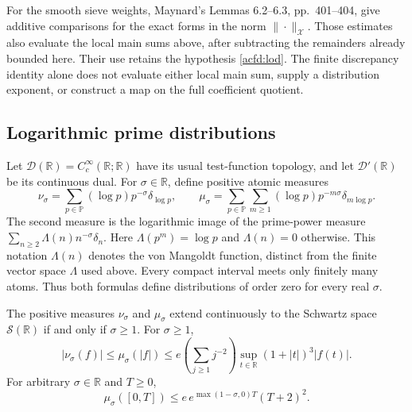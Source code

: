 For the smooth sieve weights, Maynard's Lemmas 6.2--6.3, pp.~401--404,
give additive comparisons for the exact forms in the norm $\|\cdot\|_{\mathcal X}$.
Those estimates also evaluate the local main sums above, after subtracting
the remainders already bounded here.  Their use retains the hypothesis
\eqref{acfd:lod}.  The finite discrepancy identity alone does not evaluate
either local main sum, supply a distribution exponent, or construct a map
on the full coefficient quotient.

\subsection{Logarithmic prime distributions}

Let $\mathcal D(\mathbb R)=C_c^\infty(\mathbb R;\mathbb R)$ have its usual
test-function topology, and let $\mathcal D'(\mathbb R)$ be its continuous dual.
For $\sigma\in\mathbb R$, define positive atomic measures
\begin{equation}\label{acfd:prime-measures}
 \nu_\sigma=\sum_{p\in\mathbb P}(\log p)p^{-\sigma}\delta_{\log p},
 \qquad
 \mu_\sigma=\sum_{p\in\mathbb P}\sum_{m\geq1}
                  (\log p)p^{-m\sigma}\delta_{m\log p}.
\end{equation}
The second measure is the logarithmic image of the prime-power measure
$\sum_{n\geq2}\Lambda(n)n^{-\sigma}\delta_n$.
Here $\Lambda(p^m)=\log p$ and $\Lambda(n)=0$ otherwise.
This notation $\Lambda(n)$ denotes the von Mangoldt function, distinct from
the finite vector space $\Lambda$ used above.
Every compact interval meets only finitely many atoms.
Thus both formulas define distributions of order zero for every real $\sigma$.

\begin{theorem}
The\label{acfd:tempered} positive measures $\nu_\sigma$ and $\mu_\sigma$ extend continuously to
the Schwartz space $\mathcal S(\mathbb R)$ if and only if $\sigma\geq1$.
For $\sigma\geq1$,
\[
 |\nu_\sigma(f)|\leq\mu_\sigma(|f|)
 \leq e\left(\sum_{j\geq1}j^{-2}\right)
               \sup_{t\in\mathbb R}(1+|t|)^3|f(t)|.
\]
For arbitrary $\sigma\in\mathbb R$ and $T\geq0$,
\begin{equation}\label{acfd:compact-mass}
 \mu_\sigma([0,T])
       \leq e\,e^{\max(1-\sigma,0)T}(T+2)^2.
\end{equation}
\end{theorem}

